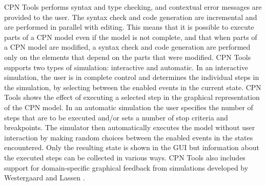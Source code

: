 

CPN Tools performs syntax and type checking, and contextual error
messages are provided to the user. The syntax check and code generation are
incremental and are performed in parallel with editing. This means
that it is possible to execute parts of a CPN model even if the model
is not complete, and that when parts of a CPN model are modified, a
syntax check and code generation are performed only on the elements
that depend on the parts that were modified. CPN Tools supports two
types of simulation: interactive and automatic. In an interactive
simulation, the user is in complete control and determines the
individual steps in the simulation, by selecting between the enabled
events in the current state. CPN Tools shows the effect of executing a
selected step in the graphical representation of the CPN model. In an
automatic simulation the user specifies the number of steps that are
to be executed and/or sets a number of stop criteria and
breakpoints. The simulator then automatically executes the model
without user interaction by making random choices between the enabled
events in the states encountered. Only the resulting state is shown in
the GUI but information about the executed steps can be collected in
various ways. CPN Tools also includes support for domain-specific
graphical feedback from simulations developed by Westergaard and
Lassen \cite{britney}.

